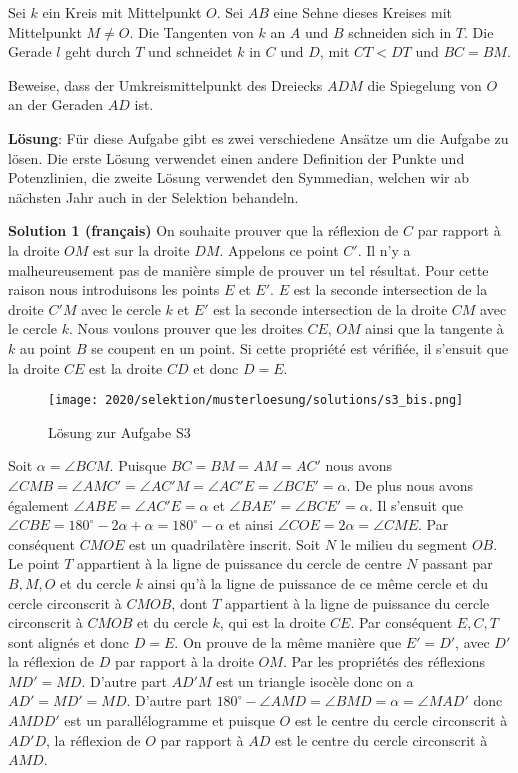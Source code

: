 Sei $k$ ein Kreis mit Mittelpunkt $O$. Sei $AB$ eine Sehne dieses Kreises mit Mittelpunkt $M \neq O$. Die Tangenten von $k$ an $A$ und $B$ schneiden sich in $T$. Die Gerade $l$ geht durch $T$ und schneidet $k$ in $C$ und $D$, mit $CT < DT$ und $BC = BM$.

Beweise, dass der Umkreismittelpunkt des Dreiecks $ADM$ die Spiegelung von $O$ an der Geraden $AD$ ist.

\textbf{Lösung}: Für diese Aufgabe gibt es zwei verschiedene Ansätze um die Aufgabe zu lösen. Die erste Lösung verwendet einen andere Definition der Punkte und Potenzlinien, die zweite Lösung verwendet den Symmedian, welchen wir ab nächsten Jahr auch in der Selektion behandeln. 

\textbf{Solution 1 (français)} On souhaite prouver que la réflexion de $C$ par rapport à la droite $OM$ est sur la droite $DM$. Appelons ce point $C'$. Il n'y a malheureusement pas de manière simple de prouver un tel résultat.
Pour cette raison nous introduisons les points $E$ et $E'$. $E$ est la seconde intersection de la droite $C'M$ avec le cercle $k$ et $E'$ est la seconde intersection de la droite $CM$ avec le cercle $k$. Nous voulons prouver que les droites $CE$, $OM$ ainsi que la tangente à $k$ au point $B$ se coupent en un point. Si cette propriété est vérifiée, il s'ensuit que la droite $CE$ est la droite $CD$ et donc $D = E$.

\begin{figure}[h]
\texttt{[image: 2020/selektion/musterloesung/solutions/s3\_bis.png]}
\caption{Lösung zur Aufgabe S3}
\end{figure}

Soit $\alpha = \angle BCM$. Puisque $BC = BM = AM = AC'$ nous avons $\angle CMB = \angle AMC' = \angle AC'M = \angle AC'E = \angle BCE' = \alpha$. De plus nous avons également $\angle ABE = \angle AC'E = \alpha$ et $\angle BAE' = \angle BCE' = \alpha$. Il s'ensuit que $\angle CBE = 180^{\circ} - 2\alpha + \alpha  = 180^{\circ} - \alpha$ et ainsi $\angle COE = 2\alpha = \angle CME$. Par conséquent $CMOE$ est un quadrilatère inscrit. Soit $N$ le milieu du segment $OB$. Le point $T$ appartient à la ligne de puissance du cercle de centre $N$ passant par $B, M, O$ et du cercle $k$ ainsi qu'à la ligne de puissance de ce même cercle et du cercle circonscrit à $CMOB$, dont $T$ appartient à la ligne de puissance du cercle circonscrit à $CMOB$ et du cercle $k$, qui est la droite $CE$. Par conséquent $E, C, T$ sont alignés et donc $D = E$. On prouve de la même manière que $E' = D'$, avec $D'$ la réflexion de $D$ par rapport à la droite $OM$.
Par les propriétés des réflexions $MD' = MD$. D'autre part $AD'M$ est un triangle isocèle donc on a $AD' = MD' = MD$. D'autre part $180^{\circ} - \angle AMD = \angle BMD = \alpha = \angle MAD'$ donc $AMDD'$ est un parallélogramme et puisque $O$ est le centre du cercle circonscrit à $AD'D$, la réflexion de $O$ par rapport à $AD$ est le centre du cercle circonscrit à $AMD$.

